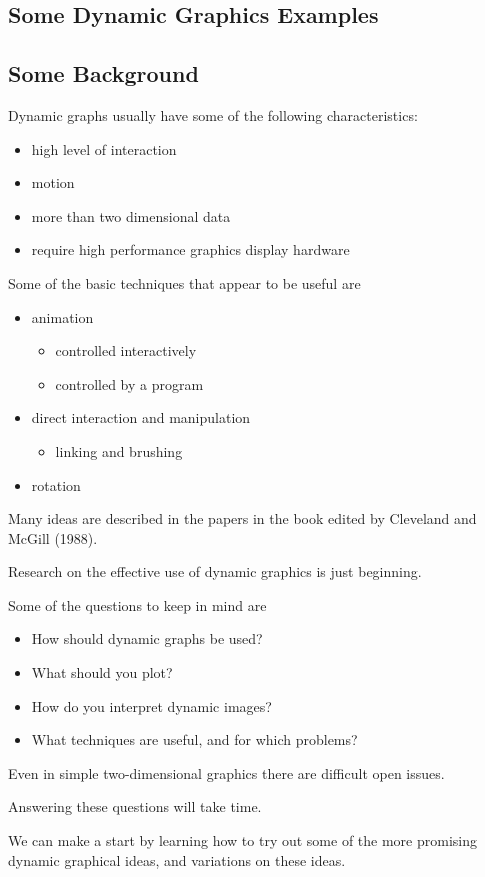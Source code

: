 \begin{slide}{}
\chapter{Some Dynamic Graphics Examples}
\end{slide}

\begin{slide}{}
\section{Some Background}

Dynamic graphs usually have some of the following characteristics:
\begin{itemize}
\item high level of interaction
\item motion
\item more than two dimensional data
\item require high performance graphics display hardware
\end{itemize}
Some of the basic techniques that appear to be useful are
\begin{itemize}
\item animation
\begin{itemize}
\item controlled interactively
\item controlled by a program
\end{itemize}
\item direct interaction and manipulation
\begin{itemize}
\item linking and brushing
\end{itemize}
\item rotation
\end{itemize}
Many ideas are described in the papers in the book edited by
Cleveland and McGill (1988).
\end{slide}

\begin{slide}{}
Research on the effective use of dynamic graphics is just beginning.

Some of the questions to keep in mind are
\begin{itemize}
\item How should dynamic graphs be used?
\item What should you plot?
\item How do you interpret dynamic images?
\item What techniques are useful, and for which problems?
\end{itemize}
Even in simple two-dimensional graphics there are difficult open issues.

Answering these questions will take time.

We can make a start by learning how to try out some of the more
promising dynamic graphical ideas, and variations on these ideas. 
\end{slide}


